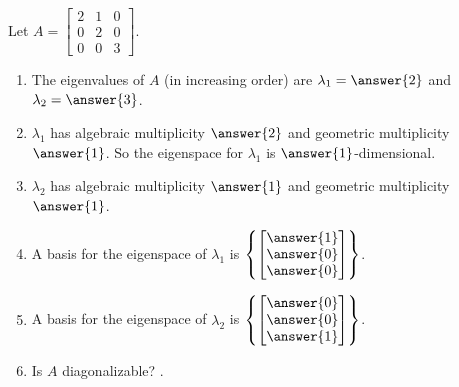 \documentclass{ximera}
\begin{document}
\begin{example}
    Let $A = \begin{bmatrix} 2 & 1 & 0 \\ 0 & 2 & 0 \\ 0 & 0 & 3 \end{bmatrix}$.
    \begin{enumerate}
        \item The eigenvalues of $A$ (in increasing order) are $\lambda_1 = \answer{2}$ and $\lambda_2 = \answer{3}$.

        \item $\lambda_1$ has algebraic multiplicity $\answer{2}$ and geometric multiplicity $\answer{1}$. So the eigenspace for $\lambda_1$ is $\answer{1}$-dimensional.

        \item $\lambda_2$ has algebraic multiplicity $\answer{1}$ and geometric multiplicity $\answer{1}$.

        \item A basis for the eigenspace of $\lambda_1 $ is $\left\{\begin{bmatrix} \answer{1} \\ \answer{0} \\ \answer{0} \end{bmatrix}\right\}$.

        \item A basis for the eigenspace of $\lambda_2 $ is $\left\{\begin{bmatrix} \answer{0} \\ \answer{0} \\ \answer{1} \end{bmatrix}\right\}$.

        \item Is $A$ diagonalizable? .
    \end{enumerate}
\end{example}
\end{document}
